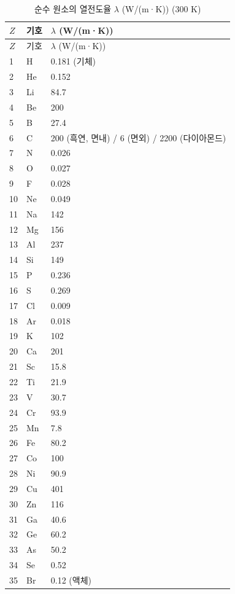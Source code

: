 \documentclass[12pt,a4paper]{article}
\begin{document}
	\begin{longtable}{p{0.6cm}p{1.2cm}p{1.5cm}}
		\caption{순수 원소의 열전도율 \(\lambda\) (W/(m·K)) (300 K)} \label{tab:thermal-conductivity-all} \\
		\toprule
		\(Z\) & 기호 & \(\lambda\) (W/(m·K)) \\
		\midrule
		\endfirsthead
		\toprule
		\(Z\) & 기호 & \(\lambda\) (W/(m·K)) \\
		\midrule
		\endhead
		1  & H  & 0.181 (기체) \\
		2  & He & 0.152 \\
		3  & Li & 84.7 \\
		4  & Be & 200 \\
		5  & B  & 27.4 \\
		6  & C  & 200 (흑연, 면내) / 6 (면외) / 2200 (다이아몬드) \\
		7  & N  & 0.026 \\
		8  & O  & 0.027 \\
		9  & F  & 0.028 \\
		10 & Ne & 0.049 \\
		11 & Na & 142 \\
		12 & Mg & 156 \\
		13 & Al & 237 \\
		14 & Si & 149 \\
		15 & P  & 0.236 \\
		16 & S  & 0.269 \\
		17 & Cl & 0.009 \\
		18 & Ar & 0.018 \\
		19 & K  & 102 \\
		20 & Ca & 201 \\
		21 & Sc & 15.8 \\
		22 & Ti & 21.9 \\
		23 & V  & 30.7 \\
		24 & Cr & 93.9 \\
		25 & Mn & 7.8 \\
		26 & Fe & 80.2 \\
		27 & Co & 100 \\
		28 & Ni & 90.9 \\
		29 & Cu & 401 \\
		30 & Zn & 116 \\
		31 & Ga & 40.6 \\
		32 & Ge & 60.2 \\
		33 & As & 50.2 \\
		34 & Se & 0.52 \\
		35 & Br & 0.12 (액체) \\

\end{longtable}
\end{document}
